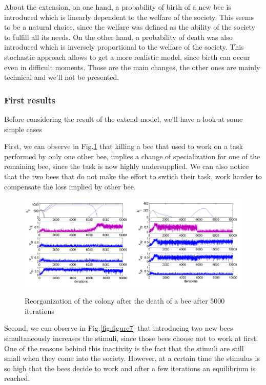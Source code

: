 About the extension, on one hand, a probability of birth of a new
bee is introduced which is linearly dependent to the welfare of the
society. This seems to be a natural choice, since the welfare was
defined as the ability of the society to fulfill all its needs. On
the other hand, a probability of death was also introduced which is
inversely proportional to the welfare of the society. This stochastic
approach allows to get a more realistic model, since birth can occur
even in difficult moments. Those are the main changes, the other ones
are mainly technical and we'll not be presented.


\subsubsection{First results}

Before considering the result of the extend model, we'll have a look
at some simple cases

First, we can observe in Fig.\ref{fig:figure6} that killing a bee that used
to work on a task performed by only one other bee, implies a change
of specialization for one of the remaining bee, since the task is
now highly undersupplied. We can also notice that the two bees that
do not make the effort to swtich their task, work harder to compensate
the loss implied by other bee.

\begin{figure}
\begin{centering}
\includegraphics[scale=0.4]{figures/Figure4}
\label{fig:figure6}
\par\end{centering}

\centering{}\caption{Reorganization of the colony after the death of a bee after 5000 iterations}
\end{figure}


Second, we can observe in Fig.\ref{fig:figure7} that introducing two new bees
simultaneously increases the stimuli, since those bees choose not
to work at first. One of the reasons behind this inactivity is the
fact that the stimuli are still small when they come into the society.
However, at a certain time the stimulus is so high that the bees decide
to work and after a few iterations an equilibrium is reached.

